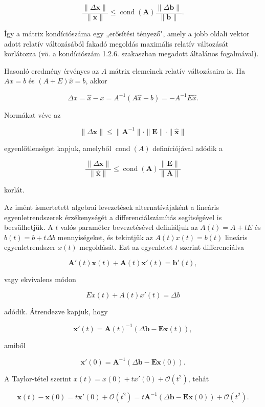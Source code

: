 \documentclass[
  magyar,
  11pt]{article}
\providecommand{\boldsymbol}[1]{\mathbf{#1}}
\begin{document}
\[\frac{\|\Delta \boldsymbol{x}\|}{\|\boldsymbol{x}\|} \leq \operatorname{cond}(\boldsymbol{A}) \frac{\|\Delta \boldsymbol{b}\|}{\|\boldsymbol{b}\|}.\]

Így a mátrix kondíciószáma egy „erősítési tényező", amely a jobb oldali
vektor adott relatív változásából fakadó megoldás maximális relatív
változását korlátozza (vö. a kondíciószám 1.2.6. szakaszban megadott
általános fogalmával).

Hasonló eredmény érvényes az \(A\) mátrix elemeinek relatív változásaira
is. Ha \(Ax = b\) és \((A + E)\hat{x} = b\), akkor

\[\Delta x = \hat{x} - x = A^{-1}(A\hat{x} - b) = -A^{-1}E\hat{x}.\]

Normákat véve az

\[\|\Delta \boldsymbol{x}\| \leq \|\boldsymbol{A}^{-1}\| \cdot \|\boldsymbol{E}\| \cdot \|\hat{\boldsymbol{x}}\|\]

egyenlőtlenséget kapjuk, amelyből \(\operatorname{cond}(A)\)
definíciójával adódik a

\[\frac{\|\Delta \boldsymbol{x}\|}{\|\hat{\boldsymbol{x}}\|} \leq \operatorname{cond}(\boldsymbol{A}) \frac{\|\boldsymbol{E}\|}{\|\boldsymbol{A}\|}\]

korlát.

Az imént ismertetett algebrai levezetések alternatívájaként a lineáris
egyenletrendszerek érzékenységét a differenciálszámítás segítségével is
becsülhetjük. A \(t\) valós paraméter bevezetésével definiáljuk az
\(A(t) = A + tE\) és \(b(t) = b + t\Delta b\) mennyiségeket, és
tekintjük az \(A(t)x(t) = b(t)\) lineáris egyenletrendszer \(x(t)\)
megoldását. Ezt az egyenletet \(t\) szerint differenciálva

\[\boldsymbol{A}'(t)\boldsymbol{x}(t) + \boldsymbol{A}(t)\boldsymbol{x}'(t) = \boldsymbol{b}'(t),\]

vagy ekvivalens módon

\[Ex(t) + A(t)x'(t) = \Delta b\]

adódik. Átrendezve kapjuk, hogy

\[\boldsymbol{x}'(t) = \boldsymbol{A}(t)^{-1} (\Delta \boldsymbol{b} - \boldsymbol{E} \boldsymbol{x}(t)),\]

amiből

\[\boldsymbol{x}'(0) = \boldsymbol{A}^{-1}(\Delta \boldsymbol{b} - \boldsymbol{E}\boldsymbol{x}(0)).\]

A Taylor-tétel szerint \(x(t) = x(0) + tx'(0) + \mathcal{O}(t^2)\),
tehát

\[\boldsymbol{x}(t) - \boldsymbol{x}(0) = t\boldsymbol{x}'(0) + \mathcal{O}(t^2) = t\boldsymbol{A}^{-1}(\Delta\boldsymbol{b} - \boldsymbol{E}\boldsymbol{x}(0)) + \mathcal{O}(t^2).\]
\end{document}
